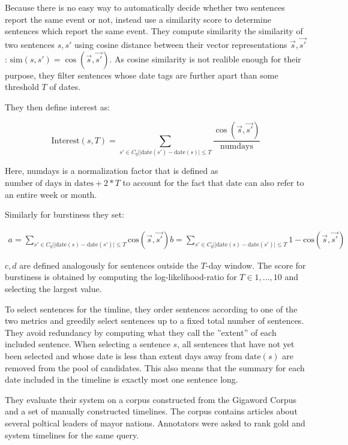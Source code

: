 \documentclass[a4paper,BCOR=10mm]{report}
\begin{document}
Because there is no easy way to automatically decide whether two sentences report the same event or not, \citeauthor{chieu} instead use a similarity score to determine sentences which report the same event. They compute similarity the similarity of two sentences $s, s'$ using cosine distance between their vector representations $\vec{s}, \vec{s'}$: $\text{sim}(s, s') = \cos(\vec{s}, \vec{s'})$.
As cosine similarity is not realible enough for their purpose, they filter sentences whose date tags are further apart than some threshold $T$ of dates.

They then define interest as:

\begin{displaymath}
\text{Interest}(s, T) = \sum_{s' \in C_q | |\text{date}(s') - \text{date}(s)| \leq T} \frac{\cos(\vec{s}, \vec{s'})}{\text{numdays}}
\end{displaymath}

Here, numdays is a normalization factor that is defined as $\text{number of days in dates} + 2 * T$ to account for the fact that $\text{date}$ can also refer to an entire week or month.

Similarly for burstiness they set:

\begin{align*}
a = \sum_{s' \in C_q | |\text{date}(s) - \text{date}(s')| \leq T} \text{cos}(\vec{s}, \vec{s'})
b = \sum_{s' \in C_q | |\text{date}(s) - \text{date}(s')| \leq T} 1 - \text{cos}(\vec{s}, \vec{s'})
\end{align*}

$c, d$ are defined analogously for sentences outside the $T$-day window. The score for burstiness is obtained by computing the log-likelihood-ratio for $T \in 1, ..., 10$ and selecting the largest value.

To select sentences for the timline, they order sentences according to one of the two metrics and greedily select sentences up to a fixed total number of sentences.
They avoid redundancy by computing what they call the ''extent'' of each included sentence. When selecting a sentence $s$, all sentences that have not yet been selected and whose date is less than extent days away from $\text{date}(s)$ are removed from the pool of candidates.
This also means that the summary for each date included in the timeline is exactly most one sentence long.

They evaluate their system on a corpus constructed from the Gigaword Corpus \citep{gigaword} and a set of manually constructed timelines. The corpus contains articles about several poltical leaders of mayor nations. Annotators were asked to rank gold and system timelines for the same query.
\end{document}
